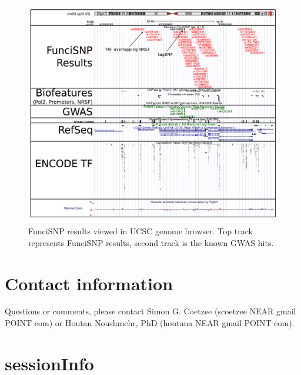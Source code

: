 \documentclass[12pt,fullpage]{article}
\begin{document}
\begin{figure}[ht!]                                                              
\begin{center}                                                                   
\includegraphics{UCSC_genomeviewer_glioma.pdf}                                    
\caption{\label{fig:FunciSNP_genome_viewer1.pdf} FunciSNP results viewed in UCSC
genome browser. Top track represents FunciSNP results, second track is the known
GWAS hits.}        
{\footnotesize{}}                                                                
\end{center}                                                                     
\end{figure}
\section{Contact information}
Questions or comments, please contact Simon G. Coetzee (scoetzee NEAR gmail 
 POINT com) or Houtan Noushmehr, PhD (houtana NEAR gmail POINT com).

\section{sessionInfo}                                                            
\end{document}
